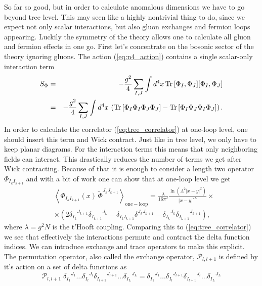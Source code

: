 So far so good, but in order to calculate anomalous dimensions we have to go beyond tree level. This may seen like a highly nontrivial thing to do, since we expect not only scalar interactions, but also gluon exchanges and fermion loops appearing. Luckily the symmetry of the theory allows one to calculate all gluon and fermion effects in one go. First let's concentrate on the bosonic sector of the theory ignoring gluons. The action (\ref{eq:n4_action}) contains a single scalar-only interaction term
\begin{eqnarray}
S_{\Phi} & = & - \frac{g^2}{4} \sum_{I,J} \int d^4 x \, \mathrm{Tr} \, [\Phi_I, \Phi_J] [\Phi_I, \Phi_J] \nonumber \\
& = & - \frac{g^2}{4} \sum_{I,J} \int d^4 x \, \left( \mathrm{Tr} \, [\Phi_I\Phi_I\Phi_J\Phi_J] - \mathrm{Tr} \, [\Phi_I\Phi_J\Phi_I\Phi_J]  \right).
\end{eqnarray} 
In order to calculate the correlator (\ref{eq:tree_correlator}) at one-loop level, one should insert this term and Wick contract. Just like in tree level, we only have to keep planar diagrams. For the interaction terms this means that only neighboring fields can interact. This drastically reduces the number of terms we get after Wick contracting. Because of that it is enough to consider a length two operator $\Phi_{I_k I_{k+1}}$ and with a bit of work one can show that at one-loop level we get \cite{minahan_spinchains}
\begin{eqnarray}
	& \left< \Phi_{I_k I_{k+1}}(x) \, \tilde{\Phi}^{J_k J_{k+1}} \right>_{\mathrm{one-loop}}  = \frac{\lambda}{16\pi^2} \frac{\ln (\Lambda^2|x-y|^2)}{|x-y|^{2L}} \times \nonumber \\ 
	& \times  \left( 2 {\delta_{I_k}}^{J_{k+1}} {\delta_{I_{k+1}}}^{J_{k}} - \delta_{I_k I_{k+1}} \delta^{J_k J_{k+1}} - {\delta_{I_k}}^{J_{k}} {\delta_{I_{k+1}}}^{J_{k+1}} \right),
	\label{eq:loop_correlator}
\end{eqnarray}
where $\lambda = g^2 N$ is the t'Hooft coupling. Comparing this to (\ref{eq:tree_correlator}) we see that effectively the interactions permute and contract the delta function indices. We can introduce exchange and trace operators to make this explicit. The permutation operator, also called the exchange operator, $\mathcal{P}_{l,l+1}$ is defined by it's action on a set of delta functions as
\begin{equation}
	\mathcal{P}_{l,l+1} \; {\delta_{I_{1}}}^{J_{1}} \dots {\delta_{I_{l}}}^{J_{l}} {\delta_{I_{l+1}}}^{J_{l+1}} \dots {\delta_{I_{L}}}^{J_{L}} = {\delta_{I_{1}}}^{J_{1}} \dots {\delta_{I_{l}}}^{J_{l+1}} {\delta_{I_{l+1}}}^{J_{l}} \dots {\delta_{I_{L}}}^{J_{L}}
\end{equation}
